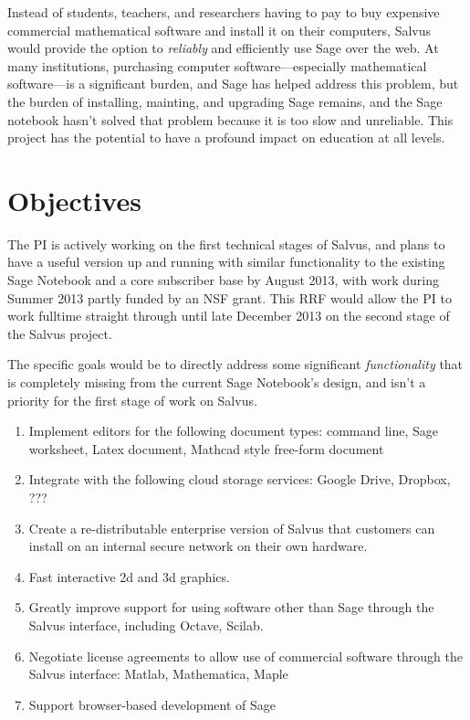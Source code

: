 \documentclass[11pt]{article}
\begin{document}
Instead of students, teachers, and researchers having to pay to buy
expensive commercial mathematical software and install it on their
computers, Salvus would provide the option to {\em reliably} and
efficiently use Sage over the web.  At many institutions, purchasing
computer software---especially mathematical software---is a
significant burden, and Sage has helped address this problem, but the
burden of installing, mainting, and upgrading Sage remains, and the
Sage notebook hasn't solved that problem because it is too slow and
unreliable.     This project has the potential to have a profound impact
on education at all levels. 

\section{Objectives}

The PI is actively working on the first technical stages of Salvus,
and plans to have a useful version up and running with similar
functionality to the existing Sage Notebook and a core subscriber base
by August 2013, with work during Summer 2013 partly funded by an NSF
grant.  This RRF would allow the PI to work fulltime straight through
until late December 2013 on the second stage of the Salvus project.

The specific goals would be to directly address some significant {\em
  functionality} that is completely missing from the current Sage
Notebook's design, and isn't a priority for the first stage of work on
Salvus.

\begin{enumerate}
\item Implement editors for the following document types: command
  line, Sage worksheet, Latex document, Mathcad style free-form
  document
\item Integrate with the following cloud storage services: Google
  Drive, Dropbox, ???
\item Create a re-distributable enterprise version of Salvus that
  customers can install on an internal secure network on their own
  hardware.
\item Fast interactive 2d and 3d graphics.
\item Greatly improve support for using software other than Sage
  through the Salvus interface, including Octave, Scilab.
\item Negotiate license agreements to allow use of commercial software
  through the Salvus interface: Matlab, Mathematica, Maple
\item Support browser-based development of Sage
\end{enumerate}
\end{document}
